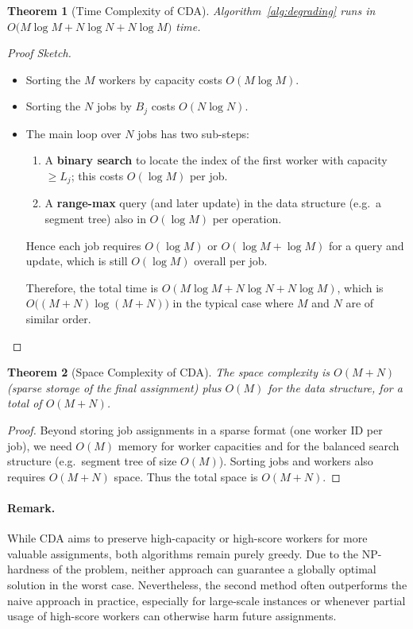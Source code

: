 \documentclass{article}
\newtheorem{theorem}{Theorem}
\begin{document}
\begin{theorem}[Time Complexity of \textsc{CDA}]
\label{thm:degrading-time}
Algorithm~\ref{alg:degrading} runs in $O\bigl(M \log M + N \log N + N\log M\bigr)$ time.
\end{theorem}
\begin{proof}[Proof Sketch]
\leavevmode
\begin{itemize}
\item Sorting the $M$ workers by capacity costs $O(M \log M)$.
\item Sorting the $N$ jobs by $B_j$ costs $O(N \log N)$.
\item The main loop over $N$ jobs has two sub-steps:
  \begin{enumerate}
    \item A \textbf{binary search} to locate the index of the first worker with capacity $\ge L_j$; this costs $O(\log M)$ per job.
    \item A \textbf{range-max} query (and later update) in the data structure (e.g.\ a segment tree) also in $O(\log M)$ per operation.
  \end{enumerate}
  Hence each job requires $O(\log M)$ or $O(\log M + \log M)$ for a query and update, which is still $O(\log M)$ overall per job.

Therefore, the total time is $O(M \log M + N \log N + N \log M)$, which is $O\bigl((M+N)\log(M+N)\bigr)$ in the typical case where $M$ and $N$ are of similar order.
\end{itemize}
\end{proof}

\begin{theorem}[Space Complexity of \textsc{CDA}]
\label{thm:degrading-space}
The space complexity is $O(M+N)$ (sparse storage of the final assignment) plus $O(M)$ for the data structure, for a total of $O(M+N)$.
\end{theorem}
\begin{proof}
Beyond storing job assignments in a sparse format (one worker ID per job), we need $O(M)$ memory for worker capacities and for the balanced search structure (e.g.\ segment tree of size $O(M)$). Sorting jobs and workers also requires $O(M+N)$ space. Thus the total space is $O(M+N)$.
\end{proof}

\paragraph{Remark.} While \textsc{CDA} aims to preserve high-capacity or high-score workers for more valuable assignments, both algorithms remain purely greedy. Due to the NP-hardness of the problem, neither approach can guarantee a globally optimal solution in the worst case. Nevertheless, the second method often outperforms the naive approach in practice, especially for large-scale instances or whenever partial usage of high-score workers can otherwise harm future assignments.
\end{document}
